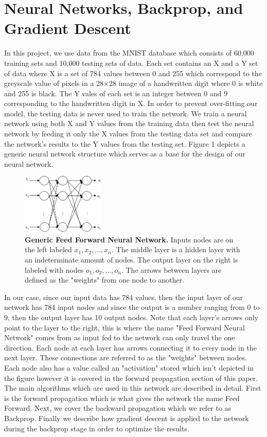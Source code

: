 \documentclass[12pt]{article}
\theoremstyle{definition}
\theoremstyle{plain}
\begin{document}
\section{Neural Networks, Backprop, and Gradient Descent}
In this project, we use data from the MNIST database which consists of 60,000 training sets and 10,000 testing sets of data. Each set contains an X and a Y set of data where X is a set of 784 values between 0 and 255 which correspond to the greyscale value of pixels in a 28$\times$28 image of a handwritten digit where 0 is white and 255 is black. The Y vales of each set is an integer between 0 and 9 corresponding to the handwritten digit in X. In order to prevent over-fitting our model, the testing data is never used to train the network. We train a neural network using both X and Y values from the training data then test the neural network by feeding it only the X values from the testing data set and compare the network's results to the Y values from the testing set. Figure 1 depicts a generic neural network structure which serves as a base for the design of our neural network.
\begin{figure}
	\centering
	\includegraphics[width=0.35\textwidth]{Images/FFNN.jpg}
	\caption{\textbf{Generic Feed Forward Neural Network.} Inputs nodes are on the left labeled $x_1,x_2,...,x_n$. The middle layer is a hidden layer with an indeterminate amount of nodes. The output layer on the right is labeled with nodes $o_1,o_2,...,o_n$. The arrows between layers are defined as the "weights" from one node to another.}
	\label{fig:FFNN}
\end{figure}
In our case, since our input data has 784 values, then the input layer of our network has 784 input nodes and since the output is a number ranging from 0 to 9, then the output layer has 10 output nodes. Note that each layer's arrows only point to the layer to the right, this is where the name "Feed Forward Neural Network" comes from as input fed to the network can only travel the one direction. Each node at each layer has arrows connecting it to every node in the next layer. These connections are referred to as the "weights" between nodes. Each node also has a value called an "activation" stored which isn't depicted in the figure however it is covered in the forward propagation section of this paper. The main algorithms which are used in this network are described in detail. First is the forward propagation which is what gives the network the name Feed Forward. Next, we cover the backward propagation which we refer to as Backprop. Finally we describe how gradient descent is applied to the network during the backprop stage in order to optimize the results.
\end{document}
